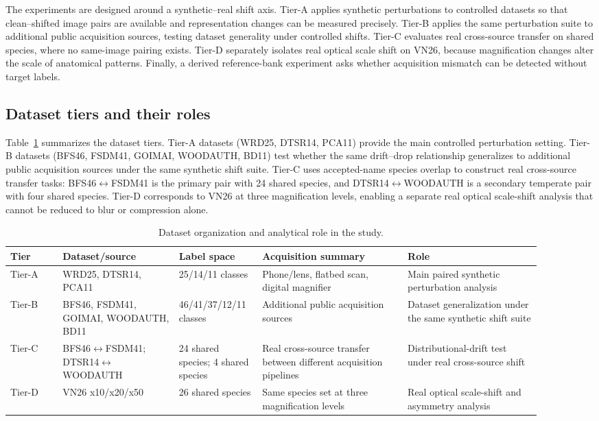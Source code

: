 \documentclass[a4paper,fleqn]{els-cas-templates/cas-sc}
\begin{document}
The experiments are designed around a synthetic--real shift axis. Tier-A applies
synthetic perturbations to controlled datasets so that clean--shifted image pairs
are available and representation changes can be measured precisely. Tier-B
applies the same perturbation suite to additional public acquisition sources,
testing dataset generality under controlled shifts. Tier-C evaluates real
cross-source transfer on shared species, where no same-image pairing exists.
Tier-D separately isolates real optical scale shift on VN26, because
magnification changes alter the scale of anatomical patterns. Finally, a derived
reference-bank experiment asks whether acquisition mismatch can be detected
without target labels.

\subsection{Dataset tiers and their roles}

Table~\ref{tab:datasets} summarizes the dataset tiers. Tier-A datasets (WRD25,
DTSR14, PCA11) provide the main controlled perturbation setting. Tier-B datasets
(BFS46, FSDM41, GOIMAI, WOODAUTH, BD11) test whether the same drift--drop
relationship generalizes to additional public acquisition sources under the same
synthetic shift suite. Tier-C uses accepted-name species overlap to construct
real cross-source transfer tasks: BFS46$\leftrightarrow$FSDM41 is the primary
pair with 24 shared species, and DTSR14$\leftrightarrow$WOODAUTH is a secondary
temperate pair with four shared species. Tier-D corresponds to VN26 at three
magnification levels, enabling a separate real optical scale-shift analysis that
cannot be reduced to blur or compression alone.

\begin{table}[pos=htbp]
\centering
\caption{Dataset organization and analytical role in the study.}
\label{tab:datasets}
\scriptsize
\setlength{\tabcolsep}{2.8pt}
\begin{tabular}{p{0.09\linewidth}p{0.20\linewidth}p{0.13\linewidth}p{0.25\linewidth}p{0.23\linewidth}}
\toprule
Tier & Dataset/source & Label space & Acquisition summary & Role \\
\midrule
Tier-A & WRD25, DTSR14, PCA11 & 25/14/11 classes & Phone/lens, flatbed scan, digital magnifier & Main paired synthetic perturbation analysis \\
Tier-B & BFS46, FSDM41, GOIMAI, WOODAUTH, BD11 & 46/41/37/12/11 classes & Additional public acquisition sources & Dataset generalization under the same synthetic shift suite \\
Tier-C & BFS46$\leftrightarrow$FSDM41; DTSR14$\leftrightarrow$WOODAUTH & 24 shared species; 4 shared species & Real cross-source transfer between different acquisition pipelines & Distributional-drift test under real cross-source shift \\
Tier-D & VN26 x10/x20/x50 & 26 shared species & Same species set at three magnification levels & Real optical scale-shift and asymmetry analysis \\
\bottomrule
\end{tabular}
\end{table}
\end{document}
